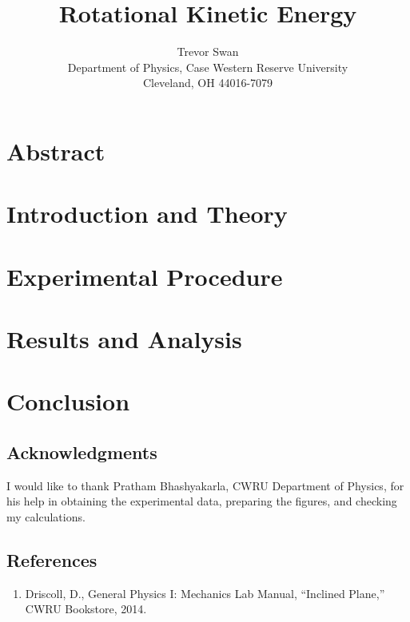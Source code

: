 \documentclass[12pt]{article}
\title{Rotational Kinetic Energy}
\author{Trevor Swan \\
Department of Physics, Case Western Reserve University \\
Cleveland, OH 44016-7079}
\date{}
\begin{document}
\pagestyle{fancy}
\fancyhf{}

\maketitle
\thispagestyle{fancy}
\renewcommand{\headrulewidth}{0pt}

\fancyfoot[C]{\thepage}

\section{Abstract}
\lipsum[1]

\section{Introduction and Theory}
\lipsum[2]

\section{Experimental Procedure}
\lipsum[3]

\section{Results and Analysis}
\lipsum[4]

\section{Conclusion}
\lipsum[6]

\subsection{Acknowledgments}
I would like to thank Pratham Bhashyakarla, CWRU Department of Physics, for his help in obtaining the experimental data, preparing the figures, and checking my calculations.

\subsection{References}
\begin{enumerate}
    \item Driscoll, D., General Physics I: Mechanics Lab Manual, “Inclined Plane,” CWRU Bookstore, 2014.
\end{enumerate}
\end{document}
